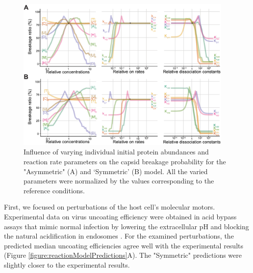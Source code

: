 \begin{figure}
\begin{center}
\includegraphics[width=0.95\textwidth, trim={0cm 0cm 0cm 0cm}, clip]{D_chapters/2_ReactionModel/SampledTrajectories.pdf}
\caption[Influence of varying individual initial protein abundances and reaction rate parameters on the capsid breakage probability]%
{Influence of varying individual initial protein abundances and reaction rate parameters on the capsid breakage probability for the "Asymmetric" (A) and ‘Symmetric’ (B) model. All the varied parameters were normalized by the values corresponding to the reference conditions.}
\label{figure:sampledTrajectories}
\end{center}
\end{figure}

First, we focused on perturbations of the host cell’s molecular motors. Experimental data on virus uncoating efficiency were obtained in acid bypass assays that mimic normal infection by lowering the extracellular pH and blocking the natural acidification in endosomes \cite{banerjee2014influenza}. For the examined perturbations, the predicted median uncoating efficiencies agree well with the experimental results (Figure \ref{figure:reactionModelPredictions}A). The "Symmetric" predictions were slightly closer to the experimental results.

